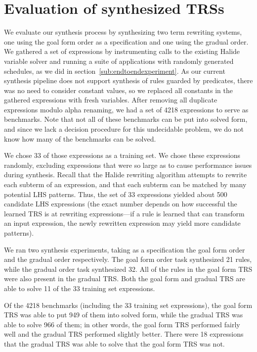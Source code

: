 \section{Evaluation of synthesized TRSs}
\label{sec:varsolvereval}

We evaluate our synthesis process by synthesizing two term rewriting systems, one using the goal form order as a specification and one using the gradual order. We gathered a set of expressions by instrumenting calls to the existing Halide variable solver and running a suite of applications with randomly generated schedules, as we did in section~\ref{sub:endtoendexperiment}. As our current synthesis pipeline does not support synthesis of rules guarded by predicates, there was no need to consider constant values, so we replaced all constants in the gathered expressions with fresh variables. After removing all duplicate expressions modulo alpha renaming, we had a set of 4218 expressions to serve as benchmarks. Note that not all of these benchmarks can be put into solved form, and since we lack a decision procedure for this undecidable problem, we do not know how many of the benchmarks can be solved.

We chose 33 of those expressions as a training set. We chose these expressions randomly, excluding expressions that were so large as to cause performance issues during synthesis. Recall that the Halide rewriting algorithm attempts to rewrite each subterm of an expression, and that each subterm can be matched by many potential LHS patterns. Thus, the set of 33 expressions yielded about 500 candidate LHS expressions (the exact number depends on how successful the learned TRS is at rewriting expressions---if a rule is learned that can transform an input expression, the newly rewritten expression may yield more candidate patterns).

We ran two synthesis experiments, taking as a specification the goal form order and the gradual order respectively. The goal form order task synthesized 21 rules, while the gradual order task synthesized 32. All of the rules in the goal form TRS were also present in the gradual TRS. Both the goal form and gradual TRS are able to solve 11 of the 33 training set expressions. 

Of the 4218 benchmarks (including the 33 training set expressions), the goal form TRS was able to put 949 of them into solved form, while the gradual TRS was able to solve 966 of them; in other words, the goal form TRS performed fairly well and the gradual TRS performed slightly better. There were 18 expressions that the gradual TRS was able to solve that the goal form TRS was not. 

